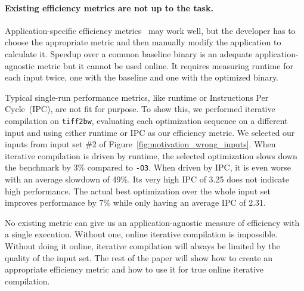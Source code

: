     \paragraph{Existing efficiency metrics are not up to the task.} Application-specific efficiency metrics~\cite{alameldeen06,coppa14} may
    work well, but the developer has to choose the appropriate metric and then manually modify the application to calculate it. Speedup
    over a common baseline binary is an adequate application-agnostic metric but it cannot be used online. It requires measuring runtime
    for each input twice, one with the baseline and one with the optimized binary.

    Typical single-run performance metrics, like runtime or Instructions Per Cycle~(IPC), are not fit for purpose. To show this, we
    performed iterative compilation on \texttt{tiff2bw}, evaluating each optimization sequence on a different input and using either
    runtime or IPC as our efficiency metric. We selected our inputs from input set \#2 of Figure~\ref{fig:motivation_wrong_inputs}. When
    iterative compilation is driven by runtime, the selected optimization slows down the benchmark by 3\% compared to \texttt{-O3}. When
    driven by IPC, it is even worse with an average slowdown of 49\%. Its very high IPC of 3.25 does not indicate high performance. The
    actual best optimization over the whole input set improves performance by 7\% while only having an average IPC of 2.31.

    No existing metric can give us an application-agnostic measure of efficiency with a single execution. Without one, online iterative
    compilation is impossible. Without doing it online, iterative compilation will always be limited by the quality of the input set.
    The rest of the paper will show how to create an appropriate efficiency metric and how to use it for true online iterative
    compilation.

